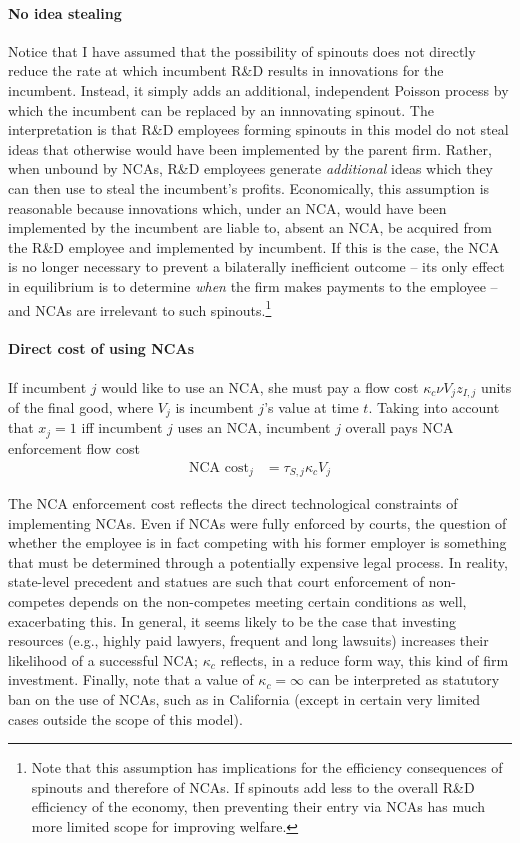\documentclass[11pt,english]{article}
\theoremstyle{remark}
\begin{document}
\paragraph{No idea stealing} Notice that I have assumed that the possibility of spinouts does not directly reduce the rate at which incumbent R\&D results in innovations for the incumbent. Instead, it simply adds an additional, independent Poisson process by which the incumbent can be replaced by an innnovating spinout. The interpretation is that R\&D employees forming spinouts in this model do not steal ideas that otherwise would have been implemented by the parent firm. Rather, when unbound by NCAs, R\&D employees generate \textit{additional} ideas which they can then use to steal the incumbent's profits. Economically, this assumption is reasonable because innovations which, under an NCA, would have been implemented by the incumbent are liable to, absent an NCA, be acquired from the R\&D employee and implemented by incumbent. If this is the case, the NCA is no longer necessary to prevent a bilaterally inefficient outcome -- its only effect in equilibrium is to determine \textit{when} the firm makes payments to the employee -- and NCAs are irrelevant to such spinouts.\footnote{Note that this assumption has implications for the efficiency consequences of spinouts and therefore of NCAs. If spinouts add less to the overall R\&D efficiency of the economy, then preventing their entry via NCAs has much more limited scope for improving welfare.}

\paragraph{Direct cost of using NCAs} 

If incumbent $j$ would like to use an NCA, she must pay a flow cost $\kappa_{c} \nu V_{j} z_{I,j}$ units of the final good, where $V_{j}$ is incumbent $j$'s value at time $t$. Taking into account that $x_j = 1$ iff incumbent $j$ uses an NCA, incumbent $j$ overall pays NCA enforcement flow cost
\begin{align*}
	\textrm{NCA cost}_{j} &= \tau_{S,j} \kappa_c V_{j}
\end{align*}

The NCA enforcement cost reflects the direct technological constraints of implementing NCAs. Even if NCAs were fully enforced by courts, the question of whether the employee is in fact competing with his former employer is something that must be determined through a potentially expensive legal process. In reality, state-level precedent and statues are such that court enforcement of non-competes depends on the non-competes meeting certain conditions as well, exacerbating this. In general, it seems likely to be the case that investing resources (e.g., highly paid lawyers, frequent and long lawsuits) increases their likelihood of a successful NCA; $\kappa_c$ reflects, in a reduce form way, this kind of firm investment. Finally, note that a value of $\kappa_c = \infty$ can be interpreted as statutory ban on the use of NCAs, such as in California (except in certain very limited cases outside the scope of this model). 
\end{document}
